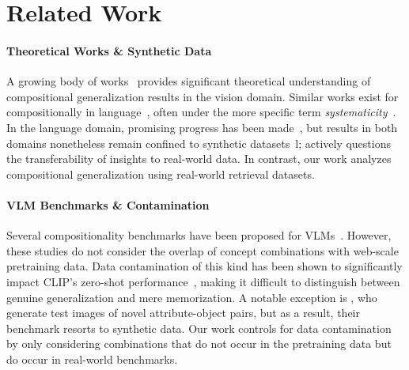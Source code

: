 \section{Related Work}
\label{sec:related}

\paragraph{Theoretical Works \& Synthetic Data}
A growing body of works~\citep{montero2021role,monteroLostLatentSpace2022,schott2022visual,lewis2022does,wiedemer2023compositional,wiedemer2024provable,okawaCompositionalAbilitiesEmerge2023, jung2024learning} provides significant theoretical understanding of compositional generalization results in the vision domain.
Similar works exist for compositionally in language~\citep{fodor1988connectionism,hupkes2020compositionality,berlot2023attribute}, often under the more specific term \emph{systematicity}~\citep{fodor1988connectionism,hupkes2020compositionality,berlot2023attribute}.
In the language domain, promising progress has been made~\citep{lake2023human}, but results in both domains nonetheless remain confined to synthetic datasets~\citep{lake2018generalization,kim2020cogs}l; \citet{sun-etal-2023-validity} actively questions the transferability of insights to real-world data. In contrast, our work analyzes compositional generalization using real-world retrieval datasets.

\paragraph{VLM Benchmarks \& Contamination}
Several compositionality benchmarks have been proposed for VLMs~\citep{thrush2022winoground, lewis2022does, zhao2022vl, yuksekgonul2023when, ma2023crepe, hsieh2023sugarcrepe, ray2024cola, wangEnhancingCompositionalGeneralization2024, abbasi2024deciphering}. However, these studies do not consider the overlap of concept combinations with web-scale pretraining data.
Data contamination of this kind has been shown to significantly impact CLIP's zero-shot performance~\cite{mayilvahanan2024search}, making it difficult to distinguish between genuine generalization and mere memorization.
A notable exception is \citet{abbasi2024deciphering}, who generate test images of novel attribute-object pairs, but as a result, their benchmark resorts to synthetic data. Our work controls for data contamination by only considering combinations that do not occur in the pretraining data but do occur in real-world benchmarks.